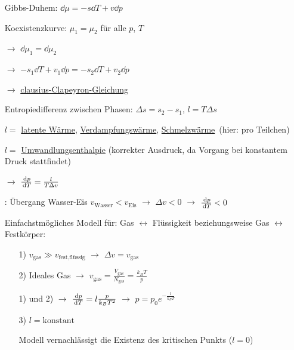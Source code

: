 \begin{itemize}[align=left]
  \item[Gibbs-Duhem:] $\dd{\mu} = - s \dd{T} + v\dd{p}$
  \item[Koexistenzkurve:] $\mu_1 = \mu_2$ für alle $p$, $T$
  \item[$\rightarrow$] $\dd{\mu_1} = \dd{\mu_2}$
  \item[$\rightarrow$] $- s_1 \dd{T} + v_1 \dd{p} = - s_2 \dd{T} + v_2 \dd{p}$
  \item[$\rightarrow$]  \uline{clausius-Clapeyron-Gleichung}
  \item[Entropiedifferenz zwischen Phasen:] $\Delta s = s_2 - s_1$, $l = T \Delta s$
  \item[$l =$] \glqq\uline{latente Wärme}\grqq, \glqq\uline{Verdampfungswärme}\grqq, \glqq\uline{Schmelzwärme}\grqq\ (hier: pro Teilchen)
  \item[$l=$] \uline{Umwandlungsenthalpie} (korrekter Ausdruck, da Vorgang bei konstantem Druck stattfindet)
  \item[$\rightarrow$] $\frac{\,\text d{p}}{\,\text d{T}} = \frac{l}{T\Delta v}$
  \item[\uwave{Beispiel}:] Übergang Wasser-Eis $v_\text{Wasser} < v_\text{Eis}$ $\rightarrow$ $\Delta v < 0$ $\rightarrow$ $\frac{\,\text d{p}}{\,\text d{T}} < 0$
  \item[Einfachstmögliches Modell für:] Gas $\leftrightarrow$ Flüssigkeit beziehungsweise Gas $\leftrightarrow$  Festkörper: \begin{itemize}[align=left]
    \item[1)] $v_\text{gas} \gg v_\text{fest,flüssig}$ $\rightarrow$ $\Delta v = v_\text{gas}$
    \item[2)] Ideales Gas $\rightarrow$ $v_\text{gas} = \frac{V_\text{gas}}{N_\text{gas}} = \frac{k_B T}{p}$
    \item[1) und 2) $\rightarrow$] $\frac{\,\text d{p}}{\,\text d{T}} = l \frac{p}{k_B T^2}$ $\rightarrow$ $p= p_0 e^{-\frac{l}{k_B T}}$
    \item[3)] $l=\text{konstant}$
    \item[Modell] vernachlässigt die Existenz des kritischen Punkts ($l=0$)
  \end{itemize}
\end{itemize}
\begin{figure}[H]
  \centering
  
\end{figure}

